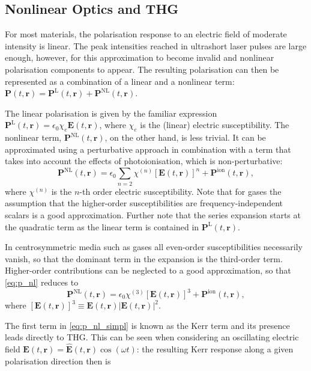 \documentclass[a4paper]{jpconf}
\begin{document}
\subsection{Nonlinear Optics and THG}
For most materials, the polarisation response to an electric field of moderate intensity is linear. The peak intensities reached in ultrashort laser pulses are large enough, however, for this approximation to become invalid and nonlinear polarisation components to appear. The resulting polarisation can then be represented as a combination of a linear and a nonlinear term: $\mathbf{P}(t, \mathbf{r}) = \mathbf{P}^\text{L}(t, \mathbf{r}) + \mathbf{P}^\text{NL}(t, \mathbf{r})$. \par 
The linear polarisation is given by the familiar expression $\mathbf{P}^\text{L}(t, \mathbf{r}) = \epsilon_0 \chi_e \mathbf{E}(t, \mathbf{r})$, where $\chi_e$ is the (linear) electric susceptibility. The nonlinear term, $\mathbf{P}^\text{NL}(t, \mathbf{r})$, on the other hand, is less trivial. It can be approximated using a perturbative approach in combination with a term that takes into account the effects of photoionisation, which is non-perturbative:
\begin{equation}\label{eq:p_nl}
\mathbf{P}^\text{NL}(t, \mathbf{r}) = \epsilon_0 \sum_{n=2} \chi^{(n)} [\mathbf{E}(t, \mathbf{r})]^n + \mathbf{P}^\text{ion}(t, \mathbf{r}),
\end{equation}
where $\chi^{(n)}$ is the $n$-th order electric susceptibility. Note that for gases the assumption that the higher-order susceptibilities are frequency-independent scalars is a good approximation. Further note that the series expansion starts at the quadratic term as the linear term is contained in $\mathbf{P}^\text{L}(t, \mathbf{r})$.  \par 
In centrosymmetric media such as gases all even-order susceptibilities necessarily vanish, so that the dominant term in the expansion is the third-order term. Higher-order contributions can be neglected to a good approximation, so that \eqref{eq:p_nl} reduces to
\begin{equation}\label{eq:p_nl_simpl}
\mathbf{P}^\text{NL}(t, \mathbf{r}) = \epsilon_0 \chi^{(3)} [\mathbf{E}(t, \mathbf{r})]^3 + \mathbf{P}^\text{ion}(t, \mathbf{r}),
\end{equation}
where $[\mathbf{E}(t, \mathbf{r})]^3 \equiv \mathbf{E}(t, \mathbf{r}) |\mathbf{E}(t, \mathbf{r})|^2$. \par 
The first term in \eqref{eq:p_nl_simpl} is known as the Kerr term and its presence leads directly to THG. This can be seen when considering an oscillating electric field $\mathbf{E}(t, \mathbf{r}) = \hat{\mathbf{E}}(t, \mathbf{r})\cos(\omega t)$: the resulting Kerr response along a given polarisation direction then is 
\end{document}

